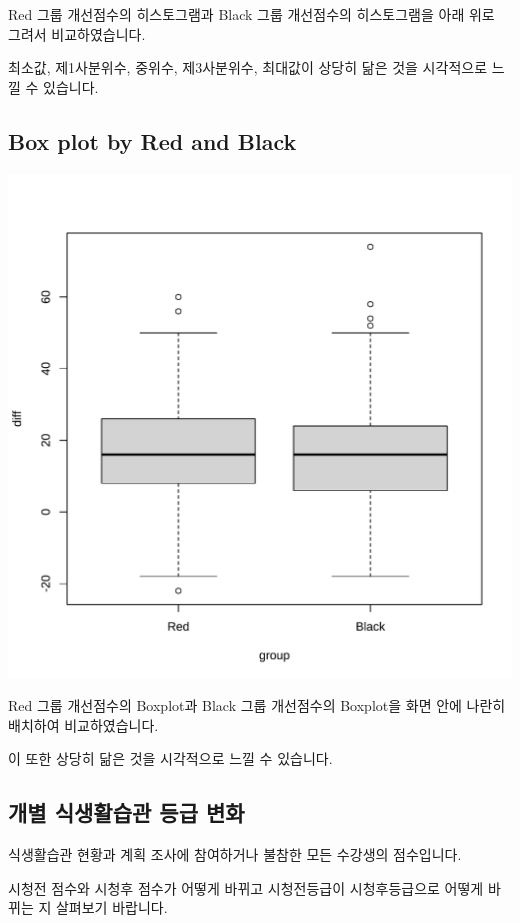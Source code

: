 \documentclass[
]{book}
\begin{document}
Red 그룹 개선점수의 히스토그램과 Black 그룹 개선점수의 히스토그램을 아래 위로 그려서 비교하였습니다.

최소값, 제1사분위수, 중위수, 제3사분위수, 최대값이 상당히 닮은 것을 시각적으로 느낄 수 있습니다.

\subsection{Box plot by Red and Black}\label{box-plot-by-red-and-black}

\includegraphics{Quiz_report_2025_files/figure-latex/unnamed-chunk-322-1.pdf}

Red 그룹 개선점수의 Boxplot과 Black 그룹 개선점수의 Boxplot을 화면 안에 나란히 배치하여 비교하였습니다.

이 또한 상당히 닮은 것을 시각적으로 느낄 수 있습니다.

\subsection{개별 식생활습관 등급 변화}\label{uxac1cuxbcc4-uxc2dduxc0dduxd65cuxc2b5uxad00-uxb4f1uxae09-uxbcc0uxd654}

식생활습관 현황과 계획 조사에 참여하거나 불참한 모든 수강생의 점수입니다.

시청전 점수와 시청후 점수가 어떻게 바뀌고 시청전등급이 시청후등급으로 어떻게 바뀌는 지 살펴보기 바랍니다.
\end{document}
